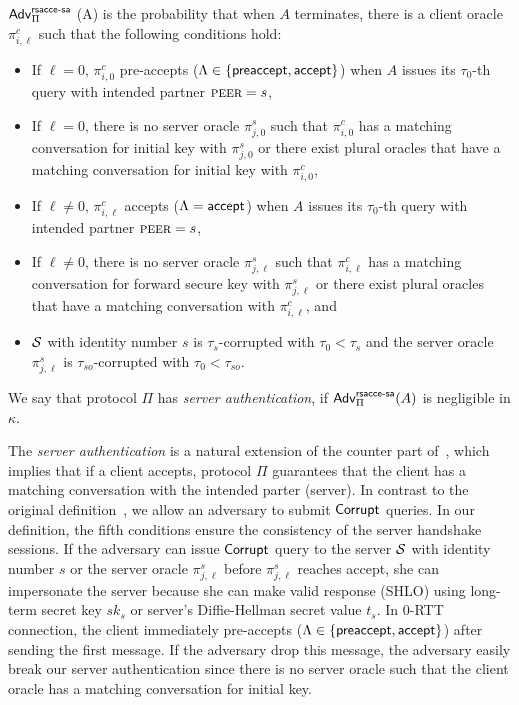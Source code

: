 \begin{definition} \label{def:rsacce-sa}
 $\mathsf{Adv}^{\mathsf{rsacce\textsc{-} sa}}_{\Pi}$ (A) is the probability that when
 $A$ terminates, there is a client oracle $\pi^c_{i, \ell}$
 such that the following conditions hold:
 \begin{itemize}
  \item{If $\ell = 0$, $\pi^c_{i, 0}$ pre-accepts
  ($\Lambda \in \{\mathsf{preaccept}, \mathsf{accept} \}$) when $A$ issues its
  $\tau_0$-th query with intended partner $\textsc{peer}=s$, }

  \item{If $\ell = 0$, there is no server oracle
  $\pi^s_{j, 0}$ such
  that $\pi^c_{i,0}$ has a matching conversation for initial
  key with
  $\pi^s_{j,0}$ or there exist plural oracles that have
  a matching conversation for initial key with $\pi^c_{i,0}$,}

  \item{If $\ell \neq 0$, $\pi^c_{i, \ell}$
  accepts ($\Lambda = \mathsf{accept}$) when $A$ issues its
  $\tau_0$-th query with intended partner $\textsc{peer}=s$, }

  \item{If $\ell \neq 0$, there is no server oracle
  $\pi^s_{j, \ell}$ such
  that $\pi^c_{i,\ell}$ has a matching conversation for forward
  secure key with
  $\pi^s_{j,\ell}$ or there exist plural oracles that have
  a matching conversation with $\pi^c_{i,\ell}$, and}

  \item{$\mathcal{S}$ with identity number $s$ is $\tau_{s}$-corrupted with
  $\tau_0 < \tau_{s}$ and the server oracle $\pi^s_{j, \ell}$ is
  $\tau_{so}$-corrupted with $\tau_0 < \tau_{so}$. }

 \end{itemize}
 We say that protocol $\Pi$ has \textit{server authentication},
 if $\mathsf{Adv}^{\mathsf{rsacce\textsc{-} sa}}_{\Pi}(A)$ is negligible in $\kappa$.
\end{definition}

\begin{remark}
 The \textit{server authentication} is a natural extension
 of the counter part of~\cite{KPW13:SACCE}, which implies
 that if a client accepts, protocol $\Pi$ guarantees that
 the client has a matching conversation with the intended
 parter (server). In contrast to the original
 definition~\cite{KPW13:SACCE}, we allow an adversary to
 submit $\mathsf{Corrupt}$ queries.
 In our definition, the fifth conditions ensure the
 consistency of the server handshake sessions.
 If the adversary can issue $\mathsf{Corrupt}$ query to the server
 $\mathcal{S}$ with identity number $s$ or the server oracle $\pi^s_{j, \ell}$
 before $\pi^s_{j, \ell}$ reaches accept, she can
 impersonate the server because she can make valid response
 (SHLO) using long-term secret key $sk_s$ or server's
 Diffie-Hellman secret value $t_s$.
 In 0-RTT connection, the client immediately pre-accepts ($\Lambda \in \{\mathsf{preaccept}, \mathsf{accept} \}$)
 after sending the first message. If the adversary drop this message, the adversary
 easily break our server authentication since there is no server oracle
 such that the client oracle has a matching conversation for initial key.

 \end{remark}

